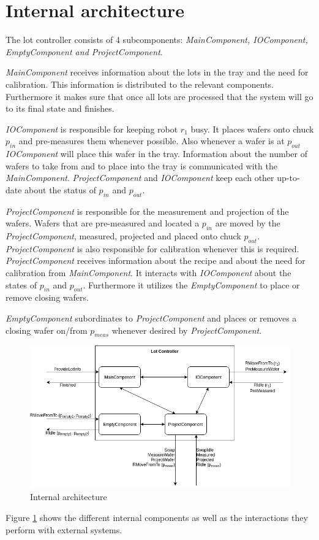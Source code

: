 \section{Internal architecture}
The lot controller consists of 4 subcomponents: \textit{MainComponent, IOComponent, EmptyComponent and ProjectComponent}.

\textit{MainComponent} receives information about the lots in the tray and the need for calibration.
This information is distributed to the relevant components.
Furthermore it makes sure that once all lots are processed that the system will go to its final state and finishes.

\textit{IOComponent} is responsible for keeping robot $r_1$ busy.
It places wafers onto chuck $p_\mathit{in}$ and pre-measures them whenever possible.
Also whenever a wafer is at $p_\mathit{out}$ \textit{IOComponent} will place this wafer in the tray.
Information about the number of wafers to take from and to place into the tray is communicated with the \textit{MainComponent}.
\textit{ProjectComponent} and \textit{IOComponent} keep each other up-to-date about the status of $p_\mathit{in}$ and $p_\mathit{out}$.

\textit{ProjectComponent} is responsible for the measurement and projection of the wafers.
Wafers that are pre-measured and located a $p_{in}$ are moved by the \textit{ProjectComponent}, measured, projected and placed onto chuck $p_\mathit{out}$.
\textit{ProjectComponent} is also responsible for calibration whenever this is required.
\textit{ProjectComponent} receives information about the recipe and about the need for calibration from \textit{MainComponent}.
It interacts with \textit{IOComponent} about the states of $p_\mathit{in}$ and $p_\mathit{out}$.
Furthermore it utilizes the \textit{EmptyComponent} to place or remove closing wafers.

\textit{EmptyComponent} subordinates to \textit{ProjectComponent} and places or removes a closing wafer on/from $p_\mathit{meas}$ whenever desired by \textit{ProjectComponent}.

\begin{figure}
    \includegraphics[width=\textwidth]{img/internal_architecture.png}
    \caption{Internal architecture}
    \label{fig:internal_arch}
\end{figure}
Figure \ref{fig:internal_arch} shows the different internal components as well as the interactions they perform with external systems. 

